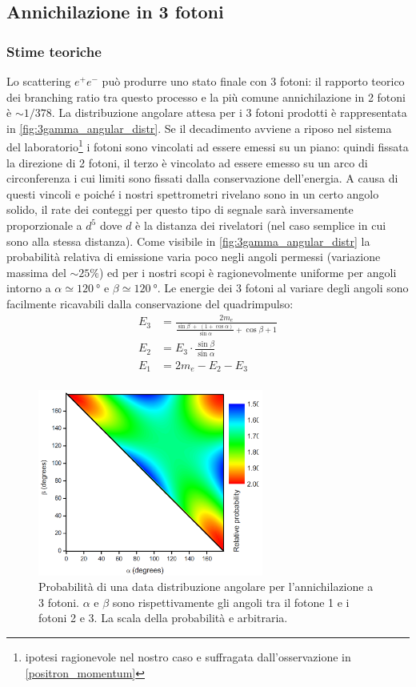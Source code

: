 \subsection{Annichilazione in 3 fotoni}

\subsubsection{Stime teoriche}
Lo scattering $e^+e^-$ può produrre uno stato finale con 3 fotoni: il rapporto teorico dei branching ratio tra questo processo e la più comune annichilazione in 2 fotoni è $\sim 1/378$\cite{3gamma}. La distribuzione angolare attesa per i 3 fotoni prodotti è rappresentata in \autoref{fig:3gamma_angular_distr}. Se il decadimento avviene a riposo nel sistema del laboratorio\footnote{ipotesi ragionevole nel nostro caso e suffragata dall'osservazione in \autoref{positron_momentum}} i fotoni sono vincolati ad essere emessi su un piano: quindi fissata la direzione di 2 fotoni, il terzo è vincolato ad essere emesso su un arco di circonferenza i cui limiti sono fissati dalla conservazione dell'energia. A causa di questi vincoli e poiché i nostri spettrometri rivelano sono in un certo angolo solido, il rate dei conteggi per questo tipo di segnale sarà inversamente proporzionale a $d^5$ dove $d$ è la distanza dei rivelatori (nel caso semplice in cui sono alla stessa distanza).
Come visibile in \autoref{fig:3gamma_angular_distr} la probabilità relativa di emissione varia poco negli angoli permessi (variazione massima del $\sim 25\%$) ed per i nostri scopi è ragionevolmente uniforme per angoli intorno a $\alpha\simeq \SI{120}{\degree}$ e $\beta\simeq\SI{120}{\degree}$.
Le energie dei 3 fotoni al variare degli angoli sono facilmente ricavabili dalla conservazione del quadrimpulso:
\begin{align*}
\label{eq:3gamma_energy}
E_3 &= \frac{2 m_e}{\frac{\sin\beta \;+\;(1+\cos\alpha)}{\sin\alpha}+\cos\beta+1}\\
E_2 &= E_3 \cdot \frac{\sin\beta}{\sin\alpha}\\
E_1 &= 2m_e - E_2 - E_3\\
\end{align*}

\begin{figure}[h]
	\centering
	\includegraphics[width=20em]{immagini/3gamma_distribution}
	\caption{\label{fig:3gamma_angular_distr}Probabilità di una data distribuzione angolare per l'annichilazione a 3 fotoni. $\alpha$ e $\beta$ sono rispettivamente gli angoli tra il fotone 1 e i fotoni 2 e 3. La scala della probabilità e arbitraria.}
\end{figure}

